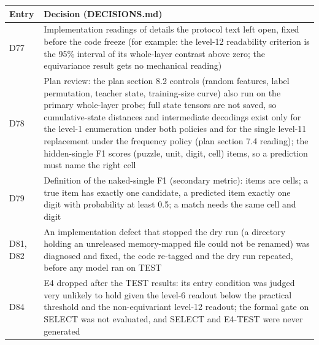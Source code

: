 \begin{tabular}{l p{10.6cm}}
\toprule
Entry & Decision (DECISIONS.md) \\
\midrule
D77 & Implementation readings of details the protocol text left open, fixed before the code freeze (for example: the level-12 readability criterion is the 95\% interval of its whole-layer contrast above zero; the equivariance result gets no mechanical reading) \\
D78 & Plan review: the plan section 8.2 controls (random features, label permutation, teacher state, training-size curve) also run on the primary whole-layer probe; full state tensors are not saved, so cumulative-state distances and intermediate decodings exist only for the level-1 enumeration under both policies and for the single level-11 replacement under the frequency policy (plan section 7.4 reading); the hidden-single F1 scores (puzzle, unit, digit, cell) items, so a prediction must name the right cell \\
D79 & Definition of the naked-single F1 (secondary metric): items are cells; a true item has exactly one candidate, a predicted item exactly one digit with probability at least 0.5; a match needs the same cell and digit \\
D81, D82 & An implementation defect that stopped the dry run (a directory holding an unreleased memory-mapped file could not be renamed) was diagnosed and fixed, the code re-tagged and the dry run repeated, before any model ran on TEST \\
D84 & E4 dropped after the TEST results: its entry condition was judged very unlikely to hold given the level-6 readout below the practical threshold and the non-equivariant level-12 readout; the formal gate on SELECT was not evaluated, and SELECT and E4-TEST were never generated \\
\bottomrule
\end{tabular}
